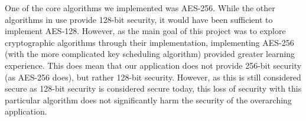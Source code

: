 One of the core algorithms we implemented was AES-256. While the other algorithms in use provide 128-bit security,
it would have been sufficient to implement AES-128. However, as the main goal of this project was to explore cryptographic 
algorithms through their implementation, implementing AES-256 (with the more complicated key scheduling algorithm) provided 
greater learning experience. This does mean that our application does not provide 256-bit security (as AES-256 does), but rather 128-bit security.
However, as this is still considered secure as 128-bit security is considered secure today, this loss of security with this particular 
algorithm does not significantly harm the security of the overarching application.
